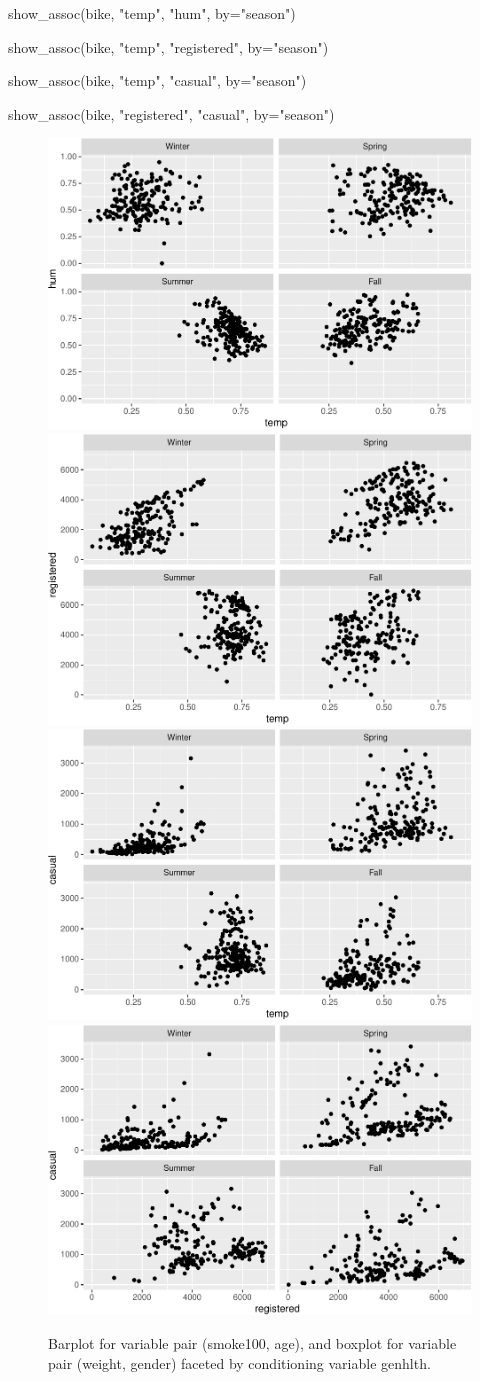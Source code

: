 \begin{Schunk}
\begin{Sinput}
show_assoc(bike, "temp", "hum", by="season")

show_assoc(bike, "temp", "registered", by="season")

show_assoc(bike, "temp", "casual", by="season")

show_assoc(bike, "registered", "casual", by="season")
\end{Sinput}
\begin{figure}
\includegraphics[width=0.5\linewidth]{rj_paper_files/figure-latex/int-pairs-conditional-cdc-1} \includegraphics[width=0.5\linewidth]{rj_paper_files/figure-latex/int-pairs-conditional-cdc-2} \includegraphics[width=0.5\linewidth]{rj_paper_files/figure-latex/int-pairs-conditional-cdc-3} \includegraphics[width=0.5\linewidth]{rj_paper_files/figure-latex/int-pairs-conditional-cdc-4} \caption[Barplot for variable pair (smoke100, age), and boxplot for variable pair (weight, gender) faceted by conditioning variable genhlth]{Barplot for variable pair (smoke100, age), and boxplot for variable pair (weight, gender) faceted by conditioning variable genhlth.}\label{fig:int-pairs-conditional-cdc}
\end{figure}
\end{Schunk}

